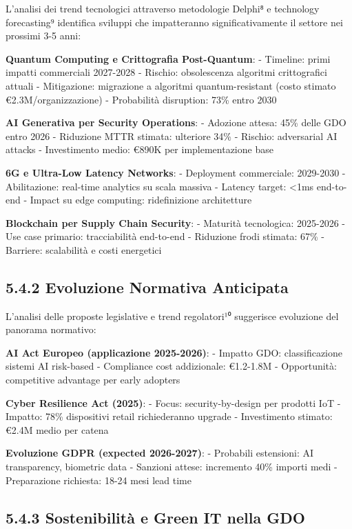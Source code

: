 \documentclass[12pt,a4paper,oneside]{book}
\numberwithin{figure}{chapter} %
\numberwithin{table}{chapter}  %
\begin{document}
L'analisi dei trend tecnologici attraverso metodologie Delphi⁸ e
technology forecasting⁹ identifica sviluppi che impatteranno
significativamente il settore nei prossimi 3-5 anni:

\textbf{Quantum Computing e Crittografia Post-Quantum}: - Timeline:
primi impatti commerciali 2027-2028 - Rischio: obsolescenza algoritmi
crittografici attuali - Mitigazione: migrazione a algoritmi
quantum-resistant (costo stimato €2.3M/organizzazione) - Probabilità
disruption: 73\% entro 2030

\textbf{AI Generativa per Security Operations}: - Adozione attesa: 45\%
delle GDO entro 2026 - Riduzione MTTR stimata: ulteriore 34\% - Rischio:
adversarial AI attacks - Investimento medio: €890K per implementazione
base

\textbf{6G e Ultra-Low Latency Networks}: - Deployment commerciale:
2029-2030 - Abilitazione: real-time analytics su scala massiva - Latency
target: \textless1ms end-to-end - Impact su edge computing:
ridefinizione architetture

\textbf{Blockchain per Supply Chain Security}: - Maturità tecnologica:
2025-2026 - Use case primario: tracciabilità end-to-end - Riduzione
frodi stimata: 67\% - Barriere: scalabilità e costi energetici

\subsection{5.4.2 Evoluzione Normativa
Anticipata}\label{evoluzione-normativa-anticipata}

L'analisi delle proposte legislative e trend regolatori¹⁰ suggerisce
evoluzione del panorama normativo:

\textbf{AI Act Europeo (applicazione 2025-2026)}: - Impatto GDO:
classificazione sistemi AI risk-based - Compliance cost addizionale:
€1.2-1.8M - Opportunità: competitive advantage per early adopters

\textbf{Cyber Resilience Act (2025)}: - Focus: security-by-design per
prodotti IoT - Impatto: 78\% dispositivi retail richiederanno upgrade -
Investimento stimato: €2.4M medio per catena

\textbf{Evoluzione GDPR (expected 2026-2027)}: - Probabili estensioni:
AI transparency, biometric data - Sanzioni attese: incremento 40\%
importi medi - Preparazione richiesta: 18-24 mesi lead time

\subsection{5.4.3 Sostenibilità e Green IT nella
GDO}\label{sostenibilituxe0-e-green-it-nella-gdo}
\end{document}
